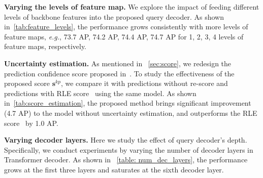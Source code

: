 \documentclass[runningheads]{llncs}
\begin{document}
\noindent\textbf{Varying the levels of feature map.} 
We explore the impact of feeding different levels of backbone features into the proposed query decoder. As shown in~\cref{tab:feature_levels}, the performance grows consistently with more levels of feature maps, \textit{e.g.},   73.7 AP, 74.2 AP,  74.4 AP,
74.7 AP for 
1, 2, 3, 4 levels of feature maps, respectively.







\noindent\textbf{Uncertainty estimation.} 
As mentioned in ~\cref{sec:score}, we redesign the prediction confidence score proposed in~\cite{li2021rle}. To study the effectiveness of the proposed score $\boldsymbol{s}^{kp}$, we compare it with predictions without re-score and predictions with RLE score~\cite{li2021rle} using the same model. As shown in~\cref{tab:score_estimation}, the proposed method brings significant improvement (4.7 AP) to the model without uncertainty estimation, and outperforms the RLE score~\cite{li2021rle} by 1.0 AP.









\noindent\textbf{Varying decoder layers.} Here we study the effect of query decoder's depth.
Specifically, we conduct experiments by varying the number of decoder layers in Transformer decoder. 
As shown in ~\cref{table: num_dec_layers}, the performance grows at the first three layers and saturates at the sixth decoder layer. 
\end{document}
